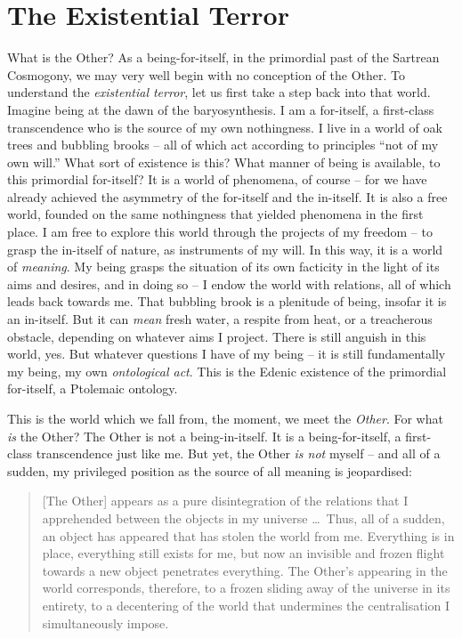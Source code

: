 \section{The Existential Terror}

What is the Other? As a being-for-itself, in the primordial past of the Sartrean Cosmogony, we may very well begin with no conception of the Other. To understand the \emph{existential terror}, let us first take a step back into that world. 
Imagine being at the dawn of the baryosynthesis. I am a for-itself, a first-class transcendence who is the source of my own nothingness. I live in a world of oak trees and bubbling brooks -- all of which act according to principles \enquote{not of my own will.} What sort of existence is this? What manner of being is available, to this primordial for-itself? It is a world of phenomena, of course -- for we have already achieved the asymmetry of the for-itself and the in-itself. It is also a free world, founded on the same nothingness that yielded phenomena in the first place. I am free to explore this world through the projects of my freedom -- to grasp the in-itself of nature, as instruments of my will. In this way, it is a world of \emph{meaning}. My being grasps the situation of its own facticity in the light of its aims and desires, and in doing so -- I endow the world with relations, all of which leads back towards me. That bubbling brook is a plenitude of being, insofar it is an in-itself. But it can \emph{mean} fresh water, a respite from heat, or a treacherous obstacle, depending on whatever aims I project. There is still anguish in this world, yes. But whatever questions I have of my being -- it is still fundamentally my being, my own \emph{ontological act}. This is the Edenic existence of the primordial for-itself, a Ptolemaic ontology.

This is the world which we fall from, the moment, we meet the \emph{Other}. For what \emph{is} the Other? The Other is not a being-in-itself. It is a being-for-itself, a first-class transcendence just like me. But yet, the Other \emph{is not} myself -- and all of a sudden, my privileged position as the source of all meaning is jeopardised: 

\blockcquote[350 -- 351]{Sartre}{[The Other] appears as a pure disintegration of the relations that I apprehended between the objects in my universe \ldots\ Thus, all of a sudden, an object has appeared that has stolen the world from me. Everything is in place, everything still exists for me, but now an invisible and frozen flight towards a new object penetrates everything. The Other's appearing in the world corresponds, therefore, to a frozen sliding away of the universe in its entirety, to a decentering of the world that undermines the centralisation I simultaneously impose.}

